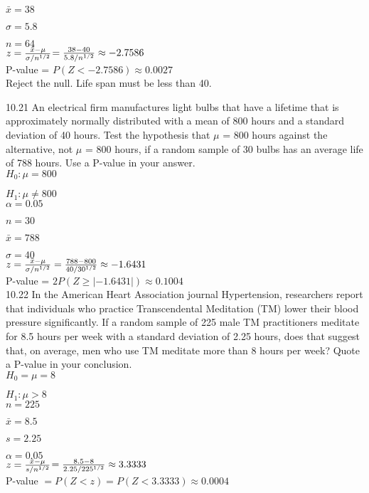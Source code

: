 $\bar{x} = 38$

$\sigma = 5.8$

$n = 64$ \\

$z = \frac{\bar{x} - \mu}{\sigma / n^{1/2}} $$ = \frac{38-40}{5.8/n^{1/2} } \approx -2.7586$ \\

P-value = $P(Z < -2.7586) \approx 0.0027$ \\

Reject the null. Life span must be less than 40.

10.21 An electrical firm manufactures light bulbs that have a lifetime that is approximately normally distributed with a mean of 800 hours and a standard deviation of 40 hours. Test the hypothesis that $\mu$ = 800 hours against the alternative, not $\mu$ = 800 hours, if a random sample of 30 bulbs has an average life of 788 hours. Use a P-value in your answer. \\

$H_0 : \mu = 800$

$H_1 : \mu \neq 800$ \\

$\alpha = 0.05$

$n = 30$

$\bar{x} = 788$

$\sigma = 40$ \\

$z = \frac{\bar{x} - \mu}{\sigma / n^{1/2}} = \frac{788- 800}{40/30^{1/2}} \approx -1.6431$ \\

P-value = $2P(Z \geq |-1.6431|) \approx 0.1004$ \\


10.22 In the American Heart Association journal Hypertension, researchers report that individuals who practice Transcendental Meditation (TM) lower their blood pressure significantly. If a random sample of 225 male TM practitioners meditate for 8.5 hours per week with a standard deviation of 2.25 hours, does that suggest that, on average, men who use TM meditate more than 8 hours per week? Quote a P-value in your conclusion. \\

$H_0 = \mu = 8$

$H_1 : \mu > 8$ \\

$n = 225$

$\bar{x} = 8.5$

$s = 2.25$

$\alpha = 0.05$ \\

$z = \frac{\bar{x} - \mu}{s/n^{1/2}}$$= \frac{8.5-8}{2.25/225^{1/2}} \approx 3.3333$ \\

P-value $= P(Z < z) = P(Z < 3.3333) \approx 0.0004$


